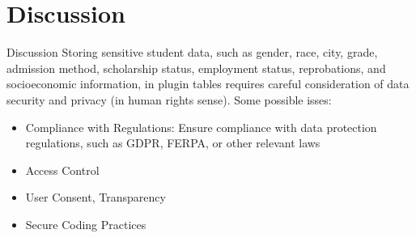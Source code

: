 \section{Discussion}

\begin{frame}{Discussion}
    Storing sensitive student data, such as gender, race, city, grade, admission method, 
    scholarship status, employment status, reprobations, and socioeconomic information, 
    in plugin tables requires careful consideration of data security and 
    privacy (in human rights sense). 
    Some possible isses:
    \begin{itemize}[<+-|alert@+>]\color{gray}
        \item Compliance with Regulations: Ensure compliance with data protection regulations, such as GDPR, FERPA, or other relevant laws
        \item Access Control
        \item User Consent, Transparency
        \item Secure Coding Practices
    \end{itemize}
    
\end{frame}